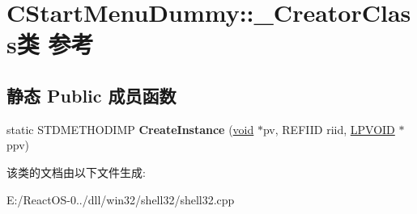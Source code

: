 \hypertarget{class_c_start_menu_dummy_1_1___creator_class}{}\section{C\+Start\+Menu\+Dummy\+:\+:\+\_\+\+Creator\+Class类 参考}
\label{class_c_start_menu_dummy_1_1___creator_class}
\subsection*{静态 Public 成员函数}
\begin{DoxyCompactItemize}
\item 
\mbox{\label{class_c_start_menu_dummy_1_1___creator_class_a004fe31752f1ac6408ffff31fd830121}} 
static S\+T\+D\+M\+E\+T\+H\+O\+D\+I\+MP {\bfseries Create\+Instance} (\hyperlink{interfacevoid}{void} $\ast$pv, R\+E\+F\+I\+ID riid, \hyperlink{interfacevoid}{L\+P\+V\+O\+ID} $\ast$ppv)
\end{DoxyCompactItemize}


该类的文档由以下文件生成\+:\begin{DoxyCompactItemize}
\item 
E\+:/\+React\+O\+S-\/0../dll/win32/shell32/shell32.\+cpp\end{DoxyCompactItemize}
